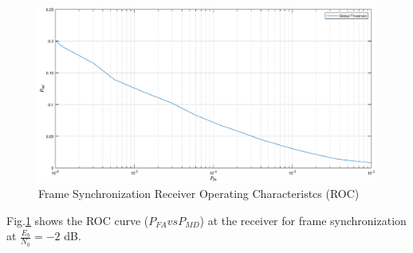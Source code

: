 \documentclass[journal,12pt,twocolumn]{IEEEtran}
\begin{document}
\begin{figure}[!ht]
\begin{center}
\includegraphics[width=\columnwidth]{./figs/framesync.eps}
\end{center}
\caption{Frame Synchronization Receiver Operating Characteristcs (ROC)}
\label{fig:frameoff}
\end{figure}

Fig.\ref{fig:frameoff} shows the ROC curve ($P_{FA} vs P_{MD}$)  at the receiver for frame synchronization at $\frac{E_b}{N_0}=-2$ dB.


%
%
%
%
%



%
%
\end{document}
